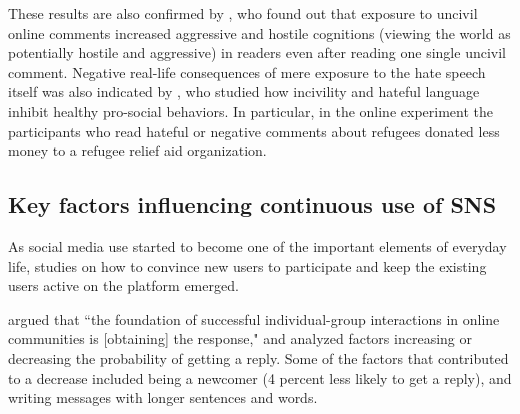 \documentclass[a4paper,fleqn]{cas-dc}
\begin{document}
These results are also confirmed by \citet{rosner2016dangerous}, who found out that exposure to uncivil online comments increased aggressive and hostile cognitions (viewing the world as potentially hostile and aggressive) in readers even after reading one single uncivil comment. 
Negative real-life consequences of mere exposure to the hate speech itself was also indicated by \citet{weber2020online}, who studied how incivility and hateful language inhibit healthy pro-social behaviors. In particular, in the online experiment the participants who read hateful or negative comments about refugees donated less money to 
a refugee relief aid organization. 

























\subsection{Key factors  influencing continuous use of SNS}

As social media use started to become one of the important elements of everyday life, studies on how to convince new users to participate and keep the existing users active on the platform emerged.

\citet{arguello2006talk} argued that ``the foundation of successful individual-group interactions in online communities is [obtaining] the response," and analyzed factors increasing or decreasing the probability of getting a reply. Some of the factors that contributed to a decrease included being a newcomer (4 percent less likely to get a reply), and writing messages with longer sentences and words.
\end{document}
